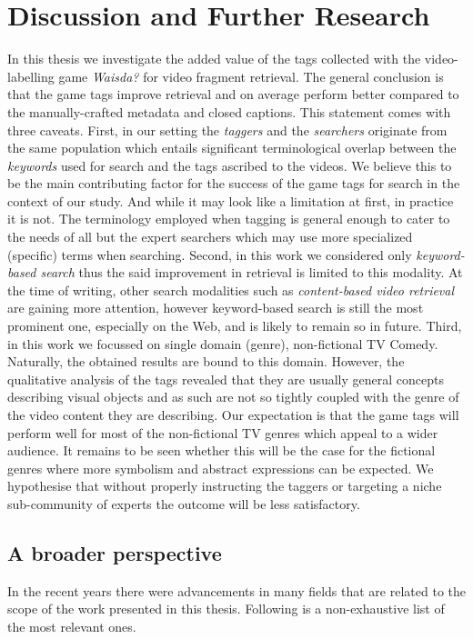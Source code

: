 \section{Discussion and Further Research}
In this thesis we investigate the added value of the tags collected with the video-labelling game \textit{Waisda?} for video fragment retrieval. The general conclusion is that the game tags improve retrieval and on average perform better compared to the manually-crafted metadata and closed captions. This statement comes with three caveats. First, in our setting the \textit{taggers} and the \textit{searchers} originate from the same population which entails significant terminological overlap between the \textit{keywords} used for search and the tags ascribed to the videos. We believe this to be the main contributing factor for the success of the game tags for search in the context of our study. And while it may look like a limitation at first, in practice it is not. The terminology employed when tagging is general enough to cater to the needs of all but the expert searchers which may use more specialized (specific) terms when searching. Second, in this work we considered only \textit{keyword-based search} thus the said improvement in retrieval is limited to this modality. At the time of writing, other search modalities such as \textit{content-based video retrieval} \cite{veltkamp2013state} are gaining more attention, however keyword-based search is still the most prominent one, especially on the Web, and is likely to remain so in future. Third, in this work we focussed on single domain (genre), non-fictional TV Comedy. Naturally, the obtained results are bound to this domain. However, the qualitative analysis of the tags revealed that they are usually general concepts describing visual objects and as such are not so tightly coupled with the genre of the video content they are describing. Our expectation is that the game tags will perform well for most of the non-fictional TV genres which appeal to a wider audience. It remains to be seen whether this will be the case for the fictional genres where more symbolism and abstract expressions can be expected. We hypothesise that without properly instructing the taggers or targeting a niche sub-community of experts the outcome will be less satisfactory.

\subsection{A broader perspective}\label{con:bigger-picture}
In the recent years there were advancements in many fields that are related to the scope of the work presented in this thesis. Following is a non-exhaustive list of the most relevant ones.

